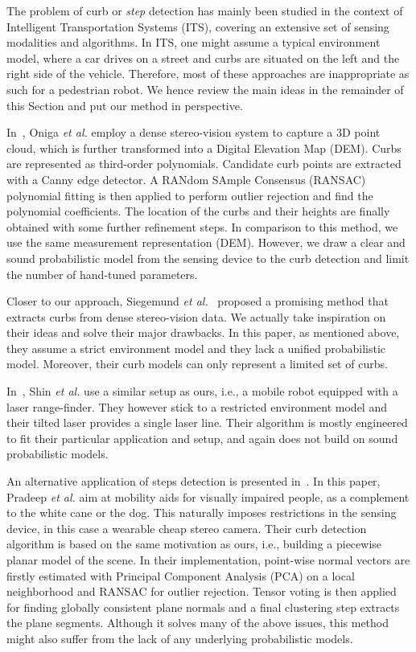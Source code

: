 The problem of curb or \emph{step} detection has mainly been studied in the
context of Intelligent Transportation Systems (ITS), covering an extensive set
of sensing modalities and algorithms. In ITS, one might assume a typical
environment model, where a car drives on a street and curbs are situated on the
left and the right side of the vehicle. Therefore, most of these approaches are
inappropriate as such for a pedestrian robot. We hence review the main ideas in
the remainder of this Section and put our method in perspective.

In~\cite{oniga10polynomial}, Oniga \emph{et al.} employ a dense stereo-vision
system to capture a 3D point cloud, which is further transformed into a Digital
Elevation Map (DEM). Curbs are represented as third-order polynomials. Candidate
curb points are extracted with a Canny edge detector. A RANdom SAmple Consensus
(RANSAC) polynomial fitting is then applied to perform outlier rejection and
find the polynomial coefficients. The location of the curbs and their heights
are finally obtained with some further refinement steps. In comparison to this
method, we use the same measurement representation (DEM). However, we draw a
clear and sound probabilistic model from the sensing device to the curb
detection and limit the number of hand-tuned parameters.

Closer to our approach, Siegemund \emph{et al.}~\cite{siegemund10curb} proposed
a promising method that extracts curbs from dense stereo-vision data. We
actually take inspiration on their ideas and solve their major drawbacks. In
this paper, as mentioned above, they assume a strict environment model and they
lack a unified probabilistic model. Moreover, their curb models can only
represent a limited set of curbs.

In~\cite{shin10drivable}, Shin \emph{et al.} use a similar setup as ours, i.e.,
a mobile robot equipped with a laser range-finder. They however stick to a
restricted environment model and their tilted laser provides a single laser
line. Their algorithm is mostly engineered to fit their particular application
and setup, and again does not build on sound probabilistic models.

An alternative application of steps detection is presented
in~\cite{pradeep08piece}. In this paper, Pradeep \emph{et al.} aim at mobility
aids for visually impaired people, as a complement to the white cane or the dog.
This naturally imposes restrictions in the sensing device, in this case a
wearable cheap stereo camera. Their curb detection algorithm is based on the
same motivation as ours, i.e., building a piecewise planar model of the scene.
In their implementation, point-wise normal vectors are firstly estimated with
Principal Component Analysis (PCA) on a local neighborhood and RANSAC for
outlier rejection. Tensor voting is then applied for finding globally
consistent plane normals and a final clustering step extracts the plane
segments. Although it solves many of the above issues, this method might also
suffer from the lack of any underlying probabilistic models.

